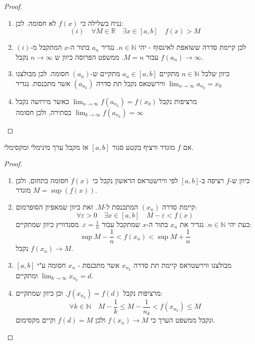 \documentclass{tstextbook}
\begin{document}
\begin{proof}
  \begin{enumerate}
    \item נניח בשלילה כי \(f(x)\) לא חסומה. לכן: 
$$(i)\quad \forall M \in \mathbb{R}\quad \exists x \in [a,b]\quad f(x)>M$$


    \item לכן קיימת סדרה ששואפת לאינסוף - יהי \(n \in \mathbb{N}\). נגדיר \(a_{n}\) בתור ה-\(x\) המתקבל מ-\((i)\) עבור \(M=n\). ממשפט הפרוסה כיוון ש \(n\to \infty\) נקבל \(f(a_{n})\to \infty\). 


    \item כיוון שלכל \(n \in \mathbb{N}\) מתקיים \(a_{n}\in [a,b]\) מתקיים ש-\((a_{n})\) חסומה. לכן מבולצנו ווירשטאס נקבל תת סדרה \((a_{n_{k}})\) אשר מתכנסת. נגדיר \(\lim_{ n \to \infty }a_{n_{k}}=x_{0}\)


    \item מרציפות נקבל \(\lim_{ n \to \infty }f(a_{n_{k}})=f(x_{0})\) כאשר מירושה נקבל \(\lim_{ k \to \infty }f(a_{n_{k}})=\infty\) בסתירה, ולכן חסומה 


  \end{enumerate}
\end{proof}
\begin{theorem}
אם \(f\) מוגדר ורציף בקטע סגור \([a,b]\) אז מקבל ערך מינימלי ומקסימלי.

\end{theorem}
\begin{proof}
  \begin{enumerate}
    \item כיוון ש-\(f\) רציפה ב-\([a,b]\) לפי ווירשטראס הראשון נקבל כי \(f(x)\) חסומה בתחום, ולכן \(M=\sup(f(x))\) מוגדר. 


    \item קיימת סדרה \((x_{n})\) המתכנסת ל-\(M\). זאת כיוון שמאפיון הסופרמום: 
$$\forall \varepsilon > 0\quad \exists x \in [a,b]\quad M-\varepsilon < f(x)$$
כעת יהי \(n \in \mathbb{N}\). נגדיר את \(x_{n}\) בתור ה-\(x\) שמתקבל עבור \(\varepsilon=\frac{1}{n}\). מסנדוויץ כיוון שמתקיים:
$$\sup M-\frac{1}{n}< f(x_{n})<\sup M+\frac{1}{n}$$
נקבל \(f(x_{n})\to M\).


    \item מבולצנו ווירשטראס קיימת תת סדרה \(x_{n_{k}}\) אשר מתכנסת - \(x_{n}\) חסומה ע"י \([a,b]\) ומתקיים \(\lim_{ k \to \infty }x_{n_{k}}=d\). 


    \item מרציפות נקבל \(f(x_{n_{k}})=f(d)\). וכן כיוון שמתקיים: 
$$\forall k \in \mathbb{N}\quad  M- \frac{1}{k}\leq M-\frac{1}{n_{k}}<f(x_{n_{k}})\leq M$$
ונקבל ממשפט הערך כי \(f(x_{n})\to M\) ולכן \(f(d)=M\) וקיים מקסימום.


  \end{enumerate}
\end{proof}
\end{document}

